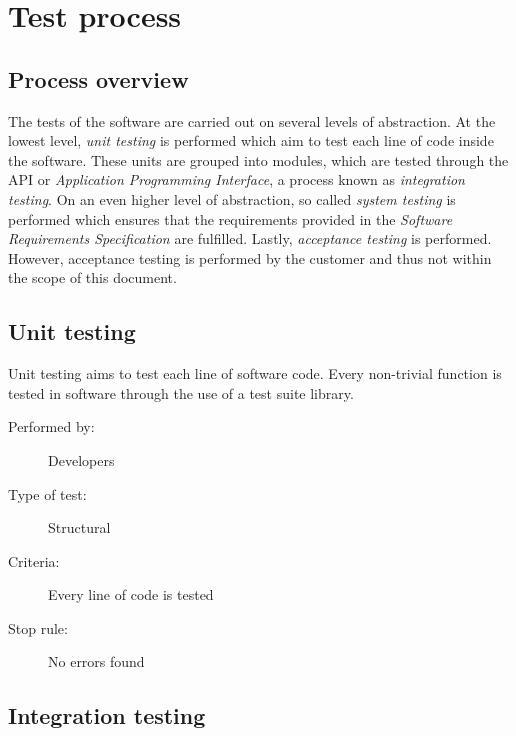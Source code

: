 \documentclass[12pt,titlepage]{article}
\begin{document}

\section{Test process}
\label{sec:test-process}

\subsection{Process overview}
\label{subsec:test-process-process-overview}

The tests of the software are carried out on several levels of abstraction. At
the lowest level, \textit{unit testing} is performed which aim to test each line
of code inside the software. These units are grouped into modules, which are
tested through the API or \textit{Application Programming Interface}, a process
known as \textit{integration testing}. On an even higher level of abstraction,
so called \textit{system testing} is performed which ensures that the
requirements provided in the \textit{Software Requirements Specification} are
fulfilled. Lastly, \textit{acceptance testing} is performed. However, acceptance
testing is performed by the customer and thus not within the scope of this
document.

\subsection{Unit testing}
\label{subsec:test-process-unit-testing}

Unit testing aims to test each line of software code. Every non-trivial function
is tested in software through the use of a test suite library.

\begin{description}
	\item[Performed by:]	Developers
	\item[Type of test:]	Structural
	\item[Criteria:]	Every line of code is tested
	\item[Stop rule:]	No errors found
\end{description}


\subsection{Integration testing}
\label{subsec:test-process-integration-testing}
\end{document}
